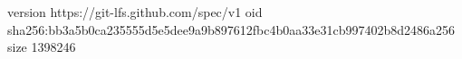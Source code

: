 version https://git-lfs.github.com/spec/v1
oid sha256:bb3a5b0ca235555d5e5dee9a9b897612fbc4b0aa33e31cb997402b8d2486a256
size 1398246
